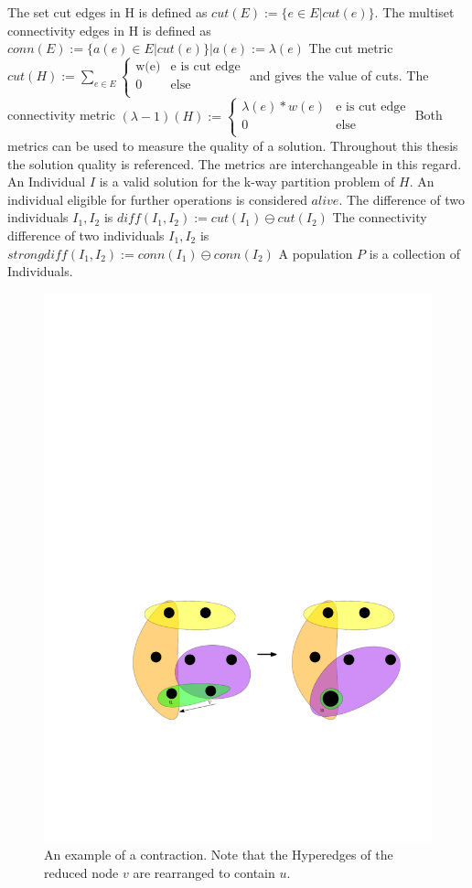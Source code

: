 \documentclass[a4paper,12pt,bibtotoc,titlepage, liststotoc,BCOR7mm,headsepline,pointlessnumbers]{scrbook}
\numberwithin{equation}{section}
\begin{document}
The set cut edges in H is defined as
$cut(E) := \{e \in E | cut(e) \}$.
The multiset connectivity edges in H is defined as
$conn(E) := \{a(e) \in E | cut(e) \} |a(e) := \lambda(e)$
The cut metric $cut(H) := \sum_{e \in E} 
\begin{cases}
       \text{w(e)} & \text{e is cut edge}\\
       \text{0} &\text{else}\\
     \end{cases}$  and gives the value of cuts.
The connectivity metric $(\lambda -1)(H) := \begin{cases}
       \text{$\lambda(e)*w(e)$} & \text{e is cut edge}\\
       \text{0} &\text{else}\\
     \end{cases}$
Both metrics can be used to measure the quality of a solution. Throughout this thesis the solution quality is referenced. The metrics are interchangeable in this regard.
An Individual $I$ is a valid solution for the k-way partition problem of $H$.
An individual eligible for further operations is considered $alive$.
The difference of two individuals $I_1, I_2$ is $diff(I_1, I_2) := cut(I_1) \ominus cut(I_2)$
The connectivity difference of two individuals $I_1, I_2$ is $strongdiff(I_1, I_2) := conn(I_1) \ominus conn(I_2)$
A population $P$ is a collection of Individuals.

\begin{figure}[t!] 
    \vspace*{-.25cm}
  \centering
   \includegraphics[width=.8\textwidth]{Ipe/Coarsening_Example.pdf}
  \caption{An example of a contraction. Note that the Hyperedges of the reduced node $v$ are rearranged to contain $u$.}\label{fig:coarsening_example}
    \vspace*{-.5cm}
\end{figure}
\end{document}
